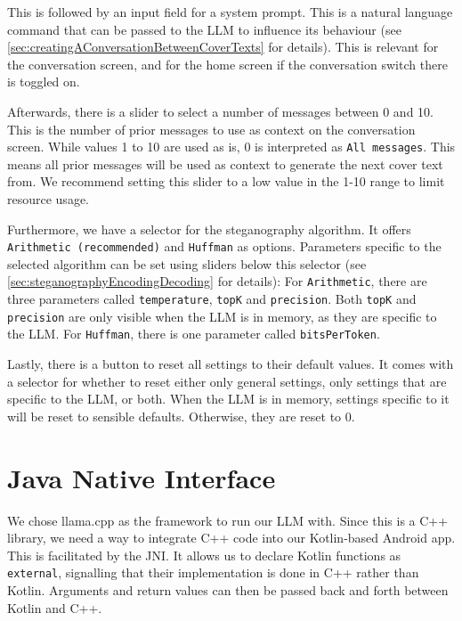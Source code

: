 This is followed by an input field for a system prompt. This is a natural language command that can be passed to the \gls{LLM} to influence its behaviour (see \cref{sec:creatingAConversationBetweenCoverTexts} for details). This is relevant for the conversation screen, and for the home screen if the conversation switch there is toggled on.

Afterwards, there is a slider to select a number of messages between 0 and 10. This is the number of prior messages to use as context on the conversation screen. While values 1 to 10 are used as is, 0 is interpreted as \lstinline|All messages|. This means all prior messages will be used as context to generate the next cover text from. We recommend setting this slider to a low value in the 1-10 range to limit resource usage.

Furthermore, we have a selector for the steganography algorithm. It offers \lstinline|Arithmetic (recommended)| and \lstinline|Huffman| as options. Parameters specific to the selected algorithm can be set using sliders below this selector (see \cref{sec:steganographyEncodingDecoding} for details): For \lstinline|Arithmetic|, there are three parameters called \lstinline|temperature|, \lstinline|topK| and \lstinline|precision|. Both \lstinline|topK| and \lstinline|precision| are only visible when the \gls{LLM} is in memory, as they are specific to the \gls{LLM}. For \lstinline|Huffman|, there is one parameter called \lstinline|bitsPerToken|.

Lastly, there is a button to reset all settings to their default values. It comes with a selector for whether to reset either only general settings, only settings that are specific to the \gls{LLM}, or both. When the \gls{LLM} is in memory, settings specific to it will be reset to sensible defaults. Otherwise, they are reset to 0.

\section{Java Native Interface}
\label{sec:javaNativeInterface}
We chose llama.cpp as the framework to run our \gls{LLM} with. Since this is a C++ library, we need a way to integrate C++ code into our Kotlin-based Android app. This is facilitated by the \gls{JNI}. It allows us to declare Kotlin functions as \lstinline|external|, signalling that their implementation is done in C++ rather than Kotlin. Arguments and return values can then be passed back and forth between Kotlin and C++.

